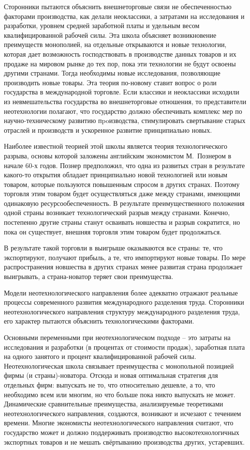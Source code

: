Сторонники пытаются объяснить внешнеторговые связи не обеспеченностью факторами
производства, как делали неоклассики, а затратами на исследования и разработки,
уровнем средней заработной платы и удельным весом квалифицированной рабочей
силы. Эта школа объясняет возникновение преимуществ монополией, на отдельные
открываются и новые технологии, которая дает возможность господствовать в
производстве данных товаров и их продаже на мировом рынке до тех пор, пока эти
технологии не будут освоены другими странами. Тогда необходимы новые
исследования, позволяющие производить новые товары. Эта теория по-новому ставит
вопрос о роли государства в международной торговле. Если классики и неоклассики
исходили из невмешательства государства во внешнеторговые отношения, то
представители неотехнологии полагают, что государство должно обеспечивать
комплекс мер по научно-техническому развитию пpoизводства, стимулировать
свертывание старых отраслей и производств и ускоренное развитие принципиально
новых.

Наиболее известной теорией этой школы является теория технологического разрыва,
основы которой заложены английским экономистом М.~Познером в начале 60-х годов.
Познер предположил, что одна из развитых стран в результате какого-то открытия
обладает принципиально новой технологией или новым товаром, которые пользуются
повышенным спросом в других странах. Поэтому торговля этим товаром будет
осуществляться даже между странами, имеющими одинаковую ресурсообеспеченность.
В результате преимущественного положения одной страны возникает технологический
разрыв между странами. Конечно, постепенно другие страны станут осваивать
новшества и разрыв сократится, но пока он существует, внешняя торговля этим
товаром будет продолжаться.

В результате такой торговли в выигрыше оказываются все страны: те, что
экспортируют, получают прибыль, а те, что импортируют новые товары. По мере
распространения новшества в других странах менее развитая страна продолжает
выигрывать, а страна-новатор теряет свои преимущества.

Модели неотехнологического направления более адекватно отражают реальные
процессы современного развития международного разделения труда. Сторонники
неотехнологического направления структуру международного разделения труда, его
характер пытаются объяснить технологическими факторами.

Основными переменными при неотехнологическом подходе -- это затраты на
исследования и разработки (в процентах от стоимости продаж), заработная плата
на одного занятого и процент квалифицированной рабочей силы. Неотехнологическая
школа связывает преимущества с монопольной позицией фирмы (и страны)-новатора.
Отсюда и новая оптимальная стратегия для отдельных фирм: выпускать не то, что
относительно дешевле, а то, что необходимо всем или многим, но что больше пока
никто выпускать не может. Динамические сравнительные преимущества,
анализируемые теоретиками неотехнологического направления, создаются, возникают
и исчезают с течением времени. Многие экономисты неотехнологического
направления считают, что государство может и должно поддерживать производство
высокотехнологичных экспортных товаров и не мешать свёртыванию производства
других, устаревших.

